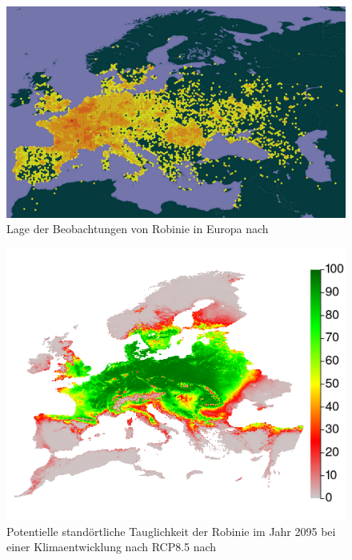 \documentclass[twocolumn]{scrartcl}
\begin{document}
\begin{figure}[htbp]
  \centering
  \includegraphics[width=.9\linewidth]{./bild/verbreitungRobEur}
  \caption{Lage der Beobachtungen von Robinie in Europa nach \citet{gbifRob}}
  \label{fig:verbreitungEur}
\end{figure}

\begin{figure}[htbp]
  \centering
  \includegraphics[width=.9\linewidth]{./bild/potentialEuropaZukunft85}
  \caption{Potentielle standörtliche Tauglichkeit der Robinie im Jahr 2095 bei einer Klimaentwicklung nach RCP8.5 nach \citet{mauri2022baumartenZukunft}}
  \label{fig:verbreitungEuPotZukunft}
\end{figure}
\end{document}
